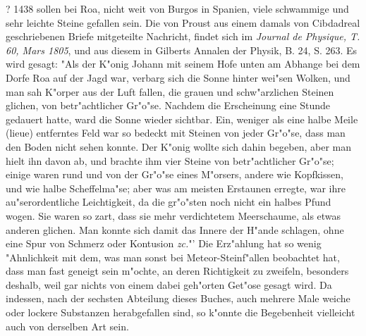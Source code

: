 \documentclass[a4paper, 11pt, oneside, polutonikogreek, german]{article}
\begin{document}
? 1438 sollen bei Roa, nicht weit von Burgos in Spanien, viele schwammige und sehr leichte Steine gefallen sein. Die von Proust aus einem damals von Cibdadreal geschriebenen Briefe mitgeteilte Nachricht, findet sich im \emph{Journal de Physique, T. 60, Mars 1805}, und aus diesem in Gilberts Annalen der Physik, B. 24, S. 263. Es wird gesagt: "Als der K"onig Johann mit seinem Hofe unten am Abhange bei dem Dorfe Roa auf der Jagd war, verbarg sich die Sonne hinter wei"sen Wolken, und man sah K"orper aus der Luft fallen, die grauen und schw"arzlichen Steinen glichen, von betr"achtlicher Gr"o"se. Nachdem die Erscheinung eine Stunde gedauert hatte, ward die Sonne wieder sichtbar. Ein, weniger als eine halbe Meile (lieue) entferntes Feld war so bedeckt mit Steinen von jeder Gr"o"se, dass man den Boden nicht sehen konnte. Der K"onig wollte sich dahin begeben, aber man hielt ihn davon ab, und brachte ihm vier Steine von betr"achtlicher Gr"o"se; einige waren rund und von der Gr"o"se eines M"orsers, andere wie Kopfkissen, und wie halbe Scheffelma"se; aber was am meisten Erstaunen erregte, war ihre au"serordentliche Leichtigkeit, da die gr"o"sten noch nicht ein halbes Pfund wogen. Sie waren so zart, dass sie mehr verdichtetem Meerschaume, als etwas anderen glichen. Man konnte sich damit das Innere der H"ande schlagen, ohne eine Spur von Schmerz oder Kontusion \emph{zc.}"' Die Erz"ahlung hat so wenig "Ahnlichkeit mit dem, was man sonst bei Meteor-Steinf"allen beobachtet hat, dass man fast geneigt sein m"ochte, an deren Richtigkeit zu zweifeln, besonders deshalb, weil gar nichts von einem dabei geh"orten Get"ose gesagt wird. Da indessen, nach der sechsten Abteilung dieses Buches, auch mehrere Male weiche oder lockere Substanzen herabgefallen sind, so k"onnte die Begebenheit vielleicht auch von derselben Art sein.
\end{document}
